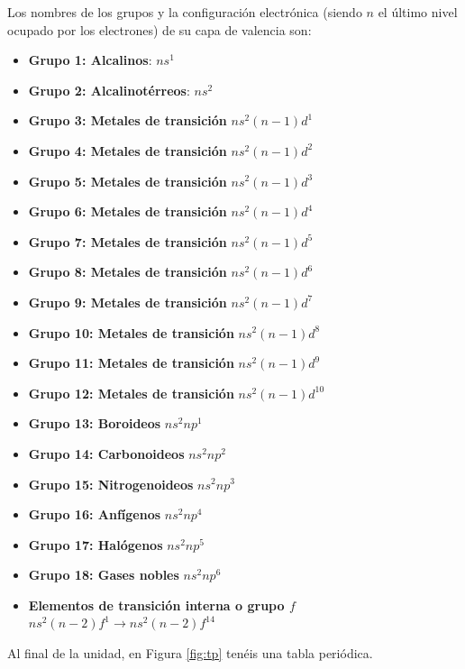 Los nombres de los grupos y la configuración electrónica (siendo \(n\) el último nivel ocupado por los electrones) de su capa de valencia son:

\begin{itemize}
    \item \textbf{Grupo 1: Alcalinos}: $ns^1$
    \item \textbf{Grupo 2: Alcalinotérreos}: $ns^2$
    \item \textbf{Grupo 3: Metales de transición} $ns^2(n-1)d^1$
    \item \textbf{Grupo 4: Metales de transición} $ns^2(n-1)d^2$
    \item \textbf{Grupo 5: Metales de transición} $ns^2(n-1)d^3$
    \item \textbf{Grupo 6: Metales de transición} $ns^2(n-1)d^4$
    \item \textbf{Grupo 7: Metales de transición} $ns^2(n-1)d^5$
    \item \textbf{Grupo 8: Metales de transición} $ns^2(n-1)d^6$
    \item \textbf{Grupo 9: Metales de transición} $ns^2(n-1)d^7$
    \item \textbf{Grupo 10: Metales de transición} $ns^2(n-1)d^8$
    \item \textbf{Grupo 11: Metales de transición} $ns^2(n-1)d^9$
    \item \textbf{Grupo 12: Metales de transición} $ns^2(n-1)d^{10}$
    \item \textbf{Grupo 13: Boroideos} $ns^2np^1$
    \item \textbf{Grupo 14: Carbonoideos} $ns^2np^2$
    \item \textbf{Grupo 15: Nitrogenoideos} $ns^2np^3$
    \item \textbf{Grupo 16: Anfígenos} $ns^2np^4$
    \item \textbf{Grupo 17: Halógenos} $ns^2np^5$
    \item \textbf{Grupo 18: Gases nobles} $ns^2np^6$
    \item \textbf{Elementos de transición interna o grupo $f$} $ns^2(n-2)f^1 \longrightarrow ns^2(n-2)f^14$
\end{itemize}
Al final de la unidad, en Figura \ref{fig:tp} tenéis una tabla periódica.



